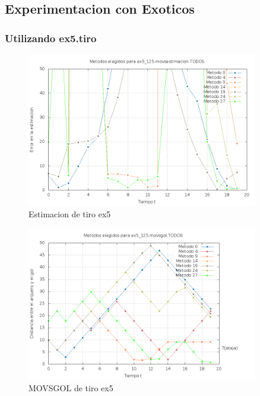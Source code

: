 \subsection{Experimentacion con Exoticos}

\subsubsection{Utilizando ex5.tiro}

\begin{figure}[H]
\begin{center}
\includegraphics[width=0.9\textwidth]{img/ex5_125_movsestimacion_TODOS_elegidos.png}
     \caption{Estimacion de tiro ex5}
\end{center}
\end{figure}

\begin{figure}[H]
\begin{center}
\includegraphics[width=0.9\textwidth]{img/ex5_125_movsgol_TODOS_elegidos.png}
     \caption{MOVSGOL de tiro ex5}
\end{center}
\end{figure}

